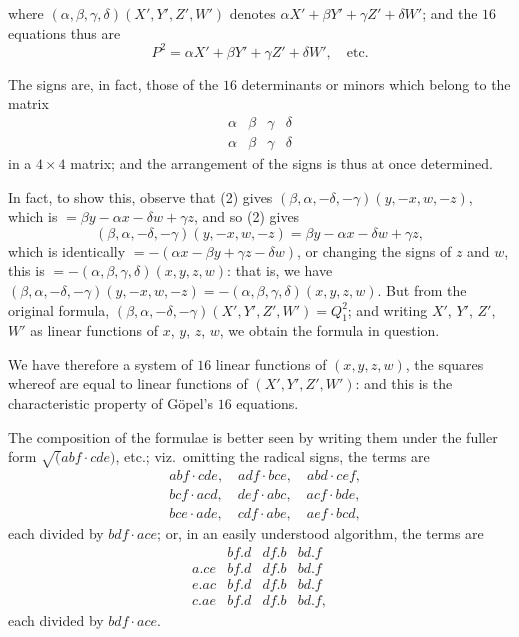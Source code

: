 \documentclass[11pt,a4paper]{article}
\theoremstyle{plain}
\theoremstyle{definition}
\begin{document}
where $(\alpha, \beta, \gamma, \delta)(X', Y', Z', W')$ denotes $\alpha X' + \beta Y' + \gamma Z' + \delta W'$; and the $16$ equations thus are
\[
P^2 = \alpha X' + \beta Y' + \gamma Z' + \delta W', \quad \text{etc.}
\]

The signs are, in fact, those of the $16$ determinants or minors which belong to the matrix
\[
\begin{matrix}
\alpha & \beta & \gamma & \delta \\
\alpha & \beta & \gamma & \delta
\end{matrix}
\]
in a $4 \times 4$ matrix; and the arrangement of the signs is thus at once determined.

In fact, to show this, observe that (2) gives $(\beta, \alpha, -\delta, -\gamma)(y, -x, w, -z)$, which is $= \beta y - \alpha x - \delta w + \gamma z$, and so (2) gives
\[
(\beta, \alpha, -\delta, -\gamma)(y, -x, w, -z) = \beta y - \alpha x - \delta w + \gamma z,
\]
which is identically $= -(\alpha x - \beta y + \gamma z - \delta w)$, or changing the signs of $z$ and $w$, this is $= -(\alpha, \beta, \gamma, \delta)(x, y, z, w)$: that is, we have $(\beta, \alpha, -\delta, -\gamma)(y, -x, w, -z) = -(\alpha, \beta, \gamma, \delta)(x, y, z, w)$. But from the original formula, $(\beta, \alpha, -\delta, -\gamma)(X', Y', Z', W') = Q_1^2$; and writing $X'$, $Y'$, $Z'$, $W'$ as linear functions of $x$, $y$, $z$, $w$, we obtain the formula in question.

We have therefore a system of $16$ linear functions of $(x, y, z, w)$, the squares whereof are equal to linear functions of $(X', Y', Z', W')$: and this is the characteristic property of G\"{o}pel's $16$ equations.

The composition of the formulae is better seen by writing them under the fuller form $\surd(abf \cdot cde)$, etc.; viz.~omitting the radical signs, the terms are
\begin{align*}
& abf \cdot cde, \quad adf \cdot bce, \quad abd \cdot cef, \\
& bcf \cdot acd, \quad def \cdot abc, \quad acf \cdot bde, \\
& bce \cdot ade, \quad cdf \cdot abe, \quad aef \cdot bcd,
\end{align*}
each divided by $bdf \cdot ace$; or, in an easily understood algorithm, the terms are
\[
\begin{array}{c|ccc}
& bf.d & df.b & bd.f \\ \hline
a.ce & bf.d & df.b & bd.f \\
e.ac & bf.d & df.b & bd.f \\
c.ae & bf.d & df.b & bd.f,
\end{array}
\]
each divided by $bdf \cdot ace$.
\end{document}
